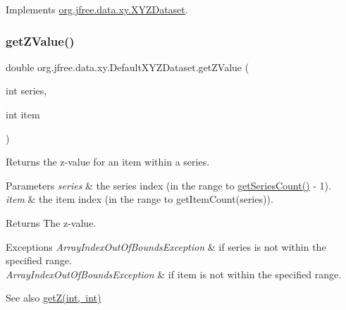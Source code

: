 Implements \mbox{\hyperlink{interfaceorg_1_1jfree_1_1data_1_1xy_1_1_x_y_z_dataset_a6a6e1c88cc1ca7cfa31c2fa043521c8a}{org.\+jfree.\+data.\+xy.\+X\+Y\+Z\+Dataset}}.

\mbox{\label{classorg_1_1jfree_1_1data_1_1xy_1_1_default_x_y_z_dataset_a629e54a55e3affb5ff0e1151df651068}} 
\subsubsection{\texorpdfstring{get\+Z\+Value()}{getZValue()}}
{\footnotesize\ttfamily double org.\+jfree.\+data.\+xy.\+Default\+X\+Y\+Z\+Dataset.\+get\+Z\+Value (\begin{DoxyParamCaption}\item[{int}]{series,  }\item[{int}]{item }\end{DoxyParamCaption})}

Returns the z-\/value for an item within a series.


\begin{DoxyParams}{Parameters}
{\em series} & the series index (in the range {} to {\ttfamily \mbox{\hyperlink{classorg_1_1jfree_1_1data_1_1xy_1_1_default_x_y_z_dataset_a115138a06afdc19d3526ef73fabf578e}{get\+Series\+Count()}} -\/ 1}). \\
\hline
{\em item} & the item index (in the range {} to {\ttfamily get\+Item\+Count(series)}).\\
\hline
\end{DoxyParams}
\begin{DoxyReturn}{Returns}
The z-\/value.
\end{DoxyReturn}

\begin{DoxyExceptions}{Exceptions}
{\em Array\+Index\+Out\+Of\+Bounds\+Exception} & if {\ttfamily series} is not within the specified range. \\
\hline
{\em Array\+Index\+Out\+Of\+Bounds\+Exception} & if {\ttfamily item} is not within the specified range.\\
\hline
\end{DoxyExceptions}
\begin{DoxySeeAlso}{See also}
\mbox{\hyperlink{classorg_1_1jfree_1_1data_1_1xy_1_1_default_x_y_z_dataset_a9d64059ab691a5d4e2de1ba1e70bb02e}{get\+Z(int, int)}} 
\end{DoxySeeAlso}


